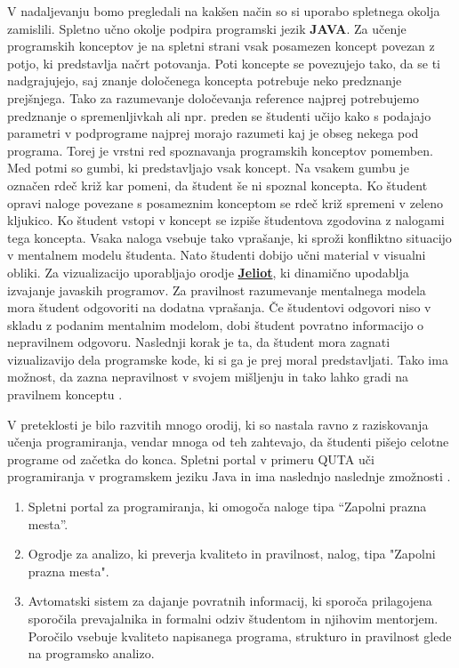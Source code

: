 V nadaljevanju bomo pregledali na kakšen način so si uporabo spletnega
okolja zamislili.  Spletno učno okolje podpira programski jezik
\textbf{JAVA}. Za učenje programskih konceptov je na spletni strani
vsak posamezen koncept povezan z potjo, ki predstavlja načrt
potovanja. Poti koncepte se povezujejo tako, da se ti nadgrajujejo,
saj znanje določenega koncepta potrebuje neko predznanje
prejšnjega. Tako za razumevanje določevanja reference najprej
potrebujemo predznanje o spremenljivkah ali npr. preden se študenti
učijo kako s podajajo parametri v podprograme najprej morajo razumeti
kaj je obseg nekega pod programa. Torej je vrstni red spoznavanja
programskih konceptov pomemben. Med potmi so gumbi, ki predstavljajo
vsak koncept. Na vsakem gumbu je označen rdeč križ kar pomeni, da
študent še ni spoznal koncepta. Ko študent opravi naloge povezane s
posameznim konceptom se rdeč križ spremeni v zeleno kljukico. Ko
študent vstopi v koncept se izpiše študentova zgodovina z nalogami
tega koncepta. Vsaka naloga vsebuje tako vprašanje, ki sproži
konfliktno situacijo v mentalnem modelu študenta. Nato študenti dobijo
učni material v visualni obliki. Za vizualizacijo uporabljajo orodje
\href{https://cs.joensuu.fi/jeliot/}{\textbf{Jeliot}}, ki dinamično
upodablja izvajanje javaskih programov. Za pravilnost razumevanje
mentalnega modela mora študent odgovoriti na dodatna vprašanja. Če
študentovi odgovori niso v skladu z podanim mentalnim modelom, dobi
študent povratno informacijo o nepravilnem odgovoru. Naslednji korak
je ta, da študent mora zagnati vizualizavijo dela programske kode, ki
si ga je prej moral predstavljati. Tako ima možnost, da zazna
nepravilnost v svojem mišljenju in tako lahko gradi na pravilnem
konceptu \cite{mentalModels}.

V preteklosti je bilo razvitih mnogo orodij, ki so nastala ravno z
raziskovanja učenja programiranja, vendar mnoga od teh zahtevajo, da
študenti pišejo celotne programe od začetka do konca. Spletni portal
v primeru QUTA uči programiranja v programskem jeziku Java in ima
naslednjo naslednje zmožnosti \cite{thesisAWebP}.

\begin{enumerate}
\tightlist
\item Spletni portal za programiranja, ki omogoča naloge tipa ``Zapolni
   prazna mesta''.
 \item Ogrodje za analizo, ki preverja kvaliteto in pravilnost, nalog,
   tipa "Zapolni prazna mesta".
 \item  Avtomatski sistem za dajanje povratnih informacij, ki sporoča
   prilagojena sporočila prevajalnika in formalni odziv študentom in
   njihovim mentorjem. Poročilo vsebuje kvaliteto napisanega programa,
   strukturo in pravilnost glede na programsko analizo.
\end{enumerate}

